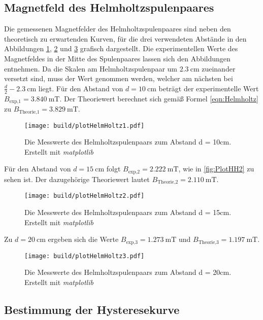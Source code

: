 \subsection{Magnetfeld des Helmholtzspulenpaares}
\label{subsec:A_Helmholtz}
Die gemessenen Magnetfelder des Helmholtzspulenpaares sind neben den theoretisch zu erwartenden Kurven, für die drei verwendeten Abstände in den Abbildungen \ref{fig:PlotHH1}, \ref{fig:PlotHH2} und \ref{fig:PlotHH3} 
grafisch dargestellt. Die experimentellen Werte des Magnetfeldes in der Mitte des Spulenpaares lassen sich den Abbildungen entnehmen. Da die Skalen am Helmholtzspulenpaar um
$2.3\:\unit{\centi\metre}$ zueinander versetzt sind, muss der Wert
genommen werden, welcher am nächsten bei $\frac{d}{2} - 2.3\:\unit{\centi\metre}$ liegt. Für den Abstand von $d = 10\:\unit{\centi\metre}$ beträgt der experimentelle Wert
$B_{\text{exp,1}} = 3.840\:\unit{\milli\tesla}$.
Der Theoriewert berechnet sich gemäß Formel \eqref{eqn:Helmholtz} zu $B_{\text{Theorie,1}} = 3.829\:\unit{\milli\tesla}$.
\begin{figure}[H]
    \centering
    \caption{Die Messwerte des Helmholtzspulenpaars zum Abstand d = 10cm. Erstellt mit \textit{matplotlib} \cite{matplotlib}}
    \label{fig:PlotHH1}
    \texttt{[image: build/plotHelmHoltz1.pdf]}
\end{figure}
Für den Abstand von $d = 15\:\unit{\centi\metre}$ folgt $B_{\text{exp,2}} = 2.222\:\unit{\milli\tesla}$, wie in \autoref{fig:PlotHH2} zu sehen ist. Der dazugehörige Theoriewert lautet $B_{\text{Theorie,2}} = 2.110\:\unit{\milli\tesla}$.
\begin{figure}[H]
    \centering
    \caption{Die Messwerte des Helmholtzspulenpaars zum Abstand d = 15cm. Erstellt mit \textit{matplotlib} \cite{matplotlib}}
    \label{fig:PlotHH2}
    \texttt{[image: build/plotHelmHoltz2.pdf]}
\end{figure}
Zu $d = 20\:\unit{\centi\metre}$ ergeben sich die Werte $B_{\text{exp,3}} = 1.273\:\unit{\milli\tesla}$ und $B_{\text{Theorie,3}} = 1.197\:\unit{\milli\tesla}$.
\begin{figure}[H]
    \centering
    \caption{Die Messwerte des Helmholtzspulenpaars zum Abstand d = 20cm. Erstellt mit \textit{matplotlib} \cite{matplotlib}}
    \label{fig:PlotHH3}
    \texttt{[image: build/plotHelmHoltz3.pdf]}
\end{figure}
\subsection{Bestimmung der Hysteresekurve}
\label{A_Hysterese}

